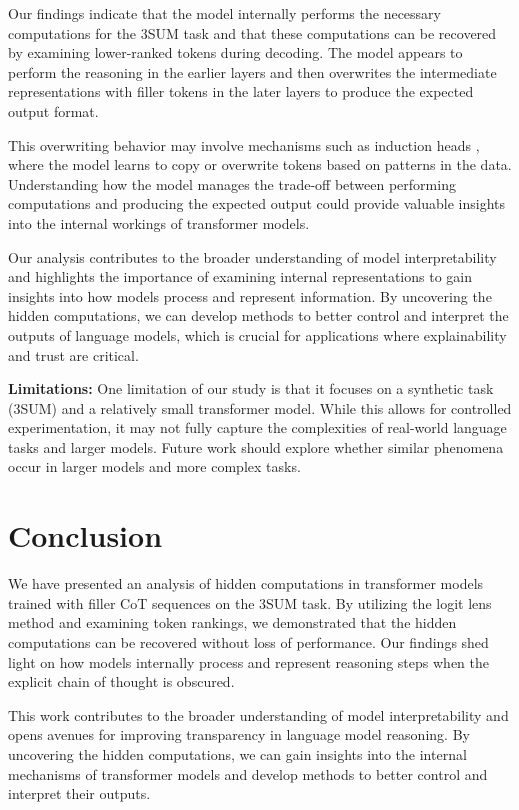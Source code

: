 \documentclass{article}
\begin{document}
Our findings indicate that the model internally performs the necessary computations for the 3SUM task and that these computations can be recovered by examining lower-ranked tokens during decoding. The model appears to perform the reasoning in the earlier layers and then overwrites the intermediate representations with filler tokens in the later layers to produce the expected output format.

This overwriting behavior may involve mechanisms such as induction heads \cite{elhage2021mathematical}, where the model learns to copy or overwrite tokens based on patterns in the data. Understanding how the model manages the trade-off between performing computations and producing the expected output could provide valuable insights into the internal workings of transformer models.

Our analysis contributes to the broader understanding of model interpretability and highlights the importance of examining internal representations to gain insights into how models process and represent information. By uncovering the hidden computations, we can develop methods to better control and interpret the outputs of language models, which is crucial for applications where explainability and trust are critical.

\textbf{Limitations:} One limitation of our study is that it focuses on a synthetic task (3SUM) and a relatively small transformer model. While this allows for controlled experimentation, it may not fully capture the complexities of real-world language tasks and larger models. Future work should explore whether similar phenomena occur in larger models and more complex tasks.

\section{Conclusion}

We have presented an analysis of hidden computations in transformer models trained with filler CoT sequences on the 3SUM task. By utilizing the logit lens method and examining token rankings, we demonstrated that the hidden computations can be recovered without loss of performance. Our findings shed light on how models internally process and represent reasoning steps when the explicit chain of thought is obscured.

This work contributes to the broader understanding of model interpretability and opens avenues for improving transparency in language model reasoning. By uncovering the hidden computations, we can gain insights into the internal mechanisms of transformer models and develop methods to better control and interpret their outputs.
\end{document}
